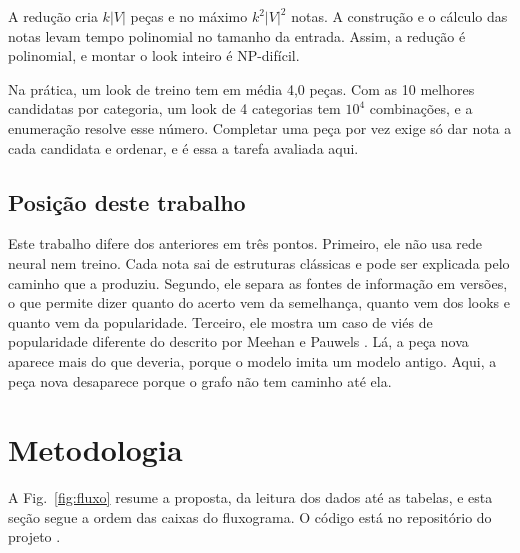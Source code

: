 \documentclass[conference]{IEEEtran}
\begin{document}
A redução cria $k|V|$ peças e no máximo $k^2|V|^2$ notas. A construção e o cálculo das notas levam tempo polinomial no tamanho da entrada. Assim, a redução é polinomial, e montar o look inteiro é NP-difícil.

Na prática, um look de treino tem em média 4,0 peças. Com as 10 melhores candidatas por categoria, um look de 4 categorias tem $10^4$ combinações, e a enumeração resolve esse número. Completar uma peça por vez exige só dar nota a cada candidata e ordenar, e é essa a tarefa avaliada aqui.

\subsection{Posição deste trabalho}

Este trabalho difere dos anteriores em três pontos. Primeiro, ele não usa rede neural nem treino. Cada nota sai de estruturas clássicas e pode ser explicada pelo caminho que a produziu. Segundo, ele separa as fontes de informação em versões, o que permite dizer quanto do acerto vem da semelhança, quanto vem dos looks e quanto vem da popularidade. Terceiro, ele mostra um caso de viés de popularidade diferente do descrito por Meehan e Pauwels \cite{meehan2025}. Lá, a peça nova aparece mais do que deveria, porque o modelo imita um modelo antigo. Aqui, a peça nova desaparece porque o grafo não tem caminho até ela.

\section{Metodologia}
\label{sec:met}
A Fig.~\ref{fig:fluxo} resume a proposta, da leitura dos dados até as tabelas, e esta seção segue a ordem das caixas do fluxograma. O código está no repositório do projeto \cite{repositorio}.
\end{document}
